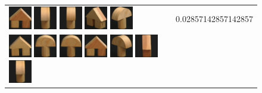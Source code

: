 {\begin{figure}[p]
\begin{tabular}{m{11cm} | m{3cm} |}
\includegraphics[width=1cm]{coil/beeld-43.eps}
\includegraphics[width=1cm]{coil/beeld-2.eps}
\includegraphics[width=1cm]{coil/beeld-5.eps}
\includegraphics[width=1cm]{coil/beeld-46.eps}
\includegraphics[width=1cm]{coil/beeld-3.eps}
& {\scriptsize 0.02857142857142857}
\\
\includegraphics[width=1cm]{coil/beeld-42.eps}
\includegraphics[width=1cm]{coil/beeld-0.eps}
\includegraphics[width=1cm]{coil/beeld-1.eps}
\includegraphics[width=1cm]{coil/beeld-43.eps}
\includegraphics[width=1cm]{coil/beeld-4.eps}
\includegraphics[width=1cm]{coil/beeld-44.eps}
\includegraphics[width=1cm]{coil/beeld-2.eps}

\end{tabular}
\end{figure}}
